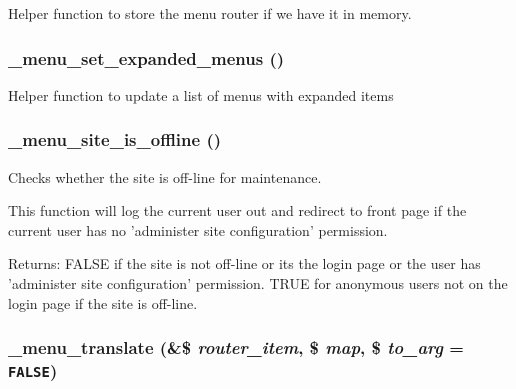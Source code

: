 Helper function to store the menu router if we have it in memory. \hypertarget{group__menu_g08212e3890c64045fcf6b44032b343a0}{
\subsubsection[{\_\-menu\_\-set\_\-expanded\_\-menus}]{\setlength{\rightskip}{0pt plus 5cm}\_\-menu\_\-set\_\-expanded\_\-menus ()}}
\label{group__menu_g08212e3890c64045fcf6b44032b343a0}


Helper function to update a list of menus with expanded items \hypertarget{group__menu_g9ec5f4bcbe8cb76396c1fa9dbbecae5a}{
\subsubsection[{\_\-menu\_\-site\_\-is\_\-offline}]{\setlength{\rightskip}{0pt plus 5cm}\_\-menu\_\-site\_\-is\_\-offline ()}}
\label{group__menu_g9ec5f4bcbe8cb76396c1fa9dbbecae5a}


Checks whether the site is off-line for maintenance.

This function will log the current user out and redirect to front page if the current user has no 'administer site configuration' permission.

\begin{Desc}
\item[Returns:]FALSE if the site is not off-line or its the login page or the user has 'administer site configuration' permission. TRUE for anonymous users not on the login page if the site is off-line. \end{Desc}
\hypertarget{group__menu_g0e8535f35bcd1a03e71120a2d6ecc099}{
\subsubsection[{\_\-menu\_\-translate}]{\setlength{\rightskip}{0pt plus 5cm}\_\-menu\_\-translate (\&\$ {\em router\_\-item}, \/  \$ {\em map}, \/  \$ {\em to\_\-arg} = {\tt FALSE})}}
\label{group__menu_g0e8535f35bcd1a03e71120a2d6ecc099}


